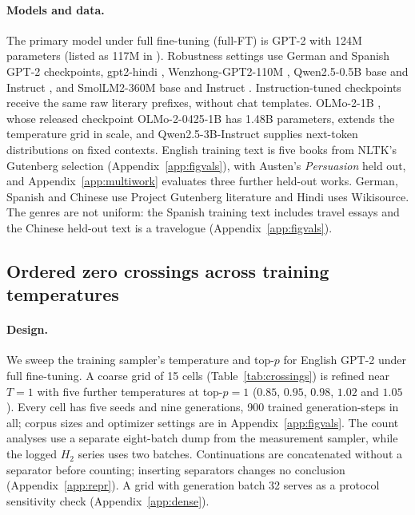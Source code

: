 \documentclass[10pt]{article}
\theoremstyle{plain}
\theoremstyle{definition}
\newcommand{\Htwo}{H_2}
\begin{document}
\paragraph{Models and data.} The primary model under full fine-tuning (full-FT) is GPT-2 with 124M parameters (listed as 117M
in \citealt{radford2019}). Robustness settings use German \citep{dbmdz2020germangpt2} and Spanish
\citep{flaxcommunity2021gpt2spanish} GPT-2 checkpoints, gpt2-hindi \citep{surajp2021gpt2hindi},
Wenzhong-GPT2-110M \citep{zhang2022fengshenbang}, Qwen2.5-0.5B base and Instruct
\citep{qwen2025}, and SmolLM2-360M base and Instruct \citep{allal2025smollm2}.
Instruction-tuned checkpoints receive the same raw literary prefixes, without chat templates.
OLMo-2-1B \citep{olmo2}, whose released checkpoint OLMo-2-0425-1B has 1.48B parameters, extends the temperature grid in scale, and
Qwen2.5-3B-Instruct supplies next-token distributions on fixed contexts. English training text
is five books from NLTK's Gutenberg selection (Appendix~\ref{app:figvals}), with Austen's
\emph{Persuasion} held out, and
Appendix~\ref{app:multiwork} evaluates three further held-out works. German, Spanish and
Chinese use Project Gutenberg literature and Hindi uses Wikisource. The genres are not
uniform: the Spanish training text includes travel essays and the Chinese held-out text is a
travelogue (Appendix~\ref{app:figvals}).

\subsection{Ordered zero crossings across training temperatures}
\label{sec:crossings}

\paragraph{Design.} We sweep the training sampler's temperature and top-$p$ for English GPT-2
under full fine-tuning. A coarse grid of 15 cells (Table~\ref{tab:crossings}) is refined near
$T=1$ with five further temperatures at top-$p=1$ ($0.85$, $0.95$, $0.98$, $1.02$ and $1.05$).
Every cell has five seeds and nine generations, 900 trained generation-steps in all; corpus
sizes and optimizer settings are in Appendix~\ref{app:figvals}. The count analyses use a separate
eight-batch dump from the measurement sampler, while the logged $\Htwo$ series uses two batches.
Continuations are concatenated without a separator before counting; inserting separators changes
no conclusion (Appendix~\ref{app:repr}). A grid with generation batch 32 serves as a protocol
sensitivity check (Appendix~\ref{app:dense}).
\end{document}
